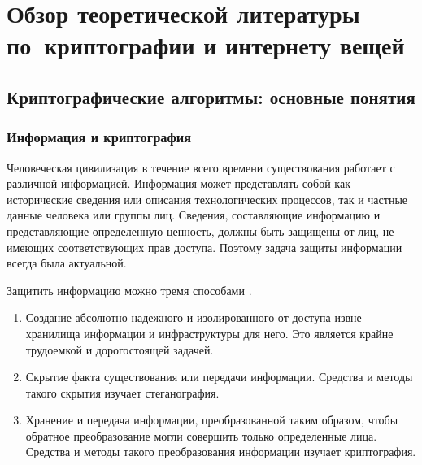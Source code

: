 \chapter{Обзор теоретической литературы по~криптографии и интернету вещей} \label{ch1}



\section{Криптографические алгоритмы: основные понятия} \label{ch1:sec1}


\subsection{Информация и криптография} %

Человеческая цивилизация в течение всего времени существования работает с различной информацией. Информация может представлять собой как исторические сведения или описания технологических процессов, так и частные данные человека или группы лиц. Сведения, составляющие информацию и представляющие определенную ценность, должны быть защищены от лиц, не имеющих соответствующих прав доступа. Поэтому задача защиты информации всегда была актуальной. 

Защитить информацию можно тремя способами \cite{src8}.
\begin{enumerate}
	\item Создание абсолютно надежного и изолированного от доступа извне хранилища информации и инфраструктуры для него. Это является крайне трудоемкой и дорогостоящей задачей.
	\item Скрытие факта существования или передачи информации. Средства и методы такого скрытия изучает стеганография.
	\item Хранение и передача информации, преобразованной таким образом, чтобы обратное преобразование могли совершить только определенные лица. Средства и методы такого преобразования информации изучает криптография.
\end{enumerate} 

